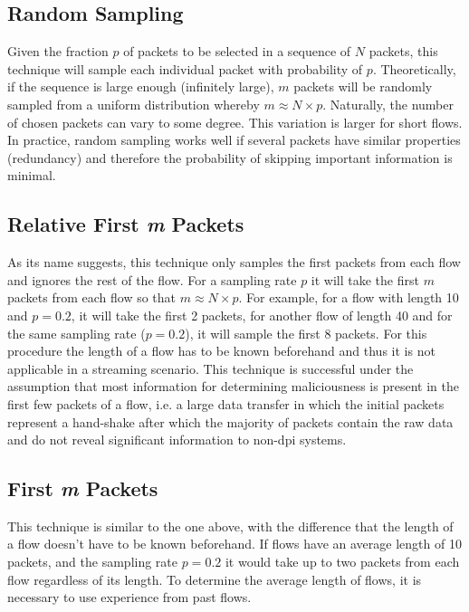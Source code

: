 \documentclass[conference]{IEEEtran}
\begin{document}
\subsection{Random Sampling}

Given the fraction $p$ of packets to be selected in a sequence of $N$ packets, this technique will sample each individual packet with probability of $p$. Theoretically, if the sequence is large enough (infinitely large), $m$ packets will be randomly sampled from a uniform distribution whereby $m \approx N \times p$. Naturally, the number of chosen packets can vary to some degree. This variation is larger for short flows. In practice, random sampling works well if several packets have similar properties (redundancy) and therefore the probability of skipping important information is minimal.

\subsection{Relative First \emph{m} Packets}
As its name suggests, this technique only samples the first packets from each flow and ignores the rest of the flow. For a sampling rate $p$ it will take the first $m$ packets from each flow so that $m \approx N \times p$. For example, for a flow with length 10 and $p=0.2$, it will take the first 2 packets, for another flow of length 40 and for the same sampling rate ($p=0.2$), it will sample the first 8 packets. For this procedure the length of a flow has to be known beforehand and thus it is not applicable in a streaming scenario. This technique is successful under the assumption that most information for determining maliciousness is present in the first few packets of a flow, i.e. a large data transfer in which the initial packets represent a hand-shake after which the majority of packets contain the raw data and do not reveal significant information to non-\gls{dpi} systems.

\subsection{First \emph{m} Packets}
This technique is similar to the one above, with the difference that the length of a flow doesn't have to be known beforehand. If flows have an average length of 10 packets, and the sampling rate $p=0.2$ it would take up to two packets from each flow regardless of its length. To determine the average length of flows, it is necessary to use experience from past flows. 
\end{document}

